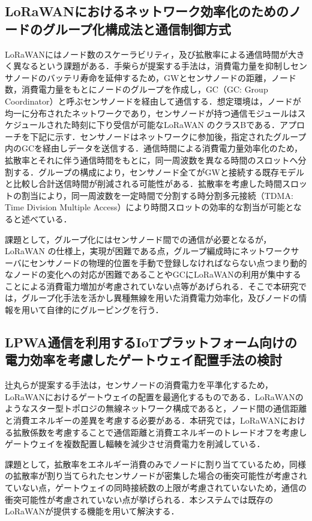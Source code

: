\documentclass[Japanese]{dicomopapers}
\begin{document}
\subsection{LoRaWANにおけるネットワーク効率化のためのノードのグループ化構成法と通信制御方式}
LoRaWANにはノード数のスケーラビリティ，及び拡散率による通信時間が大きく異なるという課題がある．手柴らが提案する手法\cite{group}は，消費電力量を抑制しセンサノードのバッテリ寿命を延伸するため，GWとセンサノードの距離，ノード数，消費電力量をもとにノードのグループを作成し，GC（GC: Group Coordinator）と呼ぶセンサノードを経由して通信する．想定環境は，ノードが均一に分布されたネットワークであり，センサノードが持つ通信モジュールはスケジュールされた時刻に下り受信が可能なLoRaWAN のクラスBである．アプローチを下記に示す．センサノードはネットワークに参加後，指定されたグループ内のGCを経由しデータを送信する．通信時間による消費電力量効率化のため，拡散率とそれに伴う通信時間をもとに，同一周波数を異なる時間のスロットへ分割する．グループの構成により，センサノード全てがGWと接続する既存モデルと比較し合計送信時間が削減される可能性がある．拡散率を考慮した時間スロットの割当により，同一周波数を一定時間で分割する時分割多元接続（TDMA: Time Division Multiple Access）により時間スロットの効率的な割当が可能となると述べている．
\par
課題として，グループ化にはセンサノード間での通信が必要となるが，LoRaWAN の仕様上，実現が困難である点，グループ編成時にネットワークサーバにセンサノードの物理的位置を手動で登録しなければならない点つまり動的なノードの変化への対応が困難であることやGCにLoRaWANの利用が集中することによる消費電力増加が考慮されていない点等があげられる．そこで本研究では，グループ化手法を活かし異種無線を用いた消費電力効率化，及びノードの情報を用いて自律的にグルーピングを行う．

\subsection{LPWA通信を利用するIoTプラットフォーム向けの電力効率を考慮したゲートウェイ配置手法の検討}
辻丸らが提案する手法\cite{gateway}は，センサノードの消費電力を平準化するため，LoRaWANにおけるゲートウェイの配置を最適化するものである．LoRaWANのようなスター型トポロジの無線ネットワーク構成であると，ノード間の通信距離と消費エネルギーの差異を考慮する必要がある．本研究では，LoRaWANにおける拡散係数を考慮することで通信距離と消費エネルギーのトレードオフを考慮しゲートウェイを複数配置し輻輳を減少させ消費電力を削減している．
\par
課題として，拡散率をエネルギー消費のみでノードに割り当てているため，同様の拡散率が割り当てられたセンサノードが密集した場合の衝突可能性が考慮されていない点，ゲートウェイの同時接続数の上限が考慮されていないため，通信の衝突可能性が考慮されていない点が挙げられる．本システムでは既存の
LoRaWANが提供する機能を用いて解決する．
\end{document}
